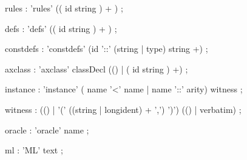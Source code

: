 \begin{rail}
rules : 'rules' (( id string ) + )
      ;

defs : 'defs' (( id string ) + )
     ;

constdefs : 'constdefs' (id '::' (string | type) string +)
          ;

axclass : 'axclass' classDecl (() | ( id string ) +)
        ;

instance : 'instance' ( name '<' name | name '::' arity) witness
         ;

witness : (() | '(' ((string | longident) + ',') ')') (() | verbatim)
        ;

oracle : 'oracle' name
       ;

ml : 'ML' text
   ;

\end{rail}

